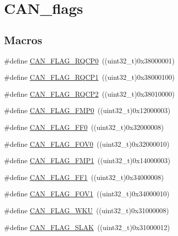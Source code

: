 \hypertarget{group___c_a_n__flags}{\section{C\-A\-N\-\_\-flags}
\label{group___c_a_n__flags}
}
\subsection*{Macros}
\begin{DoxyCompactItemize}
\item 
\#define \hyperlink{group___c_a_n__flags_ga6df0579049eb471720ea103c5446298b}{C\-A\-N\-\_\-\-F\-L\-A\-G\-\_\-\-R\-Q\-C\-P0}~((uint32\-\_\-t)0x38000001)
\item 
\#define \hyperlink{group___c_a_n__flags_gaba705586ebc3d961507436c03a2feaba}{C\-A\-N\-\_\-\-F\-L\-A\-G\-\_\-\-R\-Q\-C\-P1}~((uint32\-\_\-t)0x38000100)
\item 
\#define \hyperlink{group___c_a_n__flags_ga9c20cd47e558135bd7ae71149583d487}{C\-A\-N\-\_\-\-F\-L\-A\-G\-\_\-\-R\-Q\-C\-P2}~((uint32\-\_\-t)0x38010000)
\item 
\#define \hyperlink{group___c_a_n__flags_ga4b40574700edfe752433bb4e0d457c64}{C\-A\-N\-\_\-\-F\-L\-A\-G\-\_\-\-F\-M\-P0}~((uint32\-\_\-t)0x12000003)
\item 
\#define \hyperlink{group___c_a_n__flags_ga11648741ff43af1561ce7009698fb797}{C\-A\-N\-\_\-\-F\-L\-A\-G\-\_\-\-F\-F0}~((uint32\-\_\-t)0x32000008)
\item 
\#define \hyperlink{group___c_a_n__flags_ga2abd66b5e0032132673208decd2d01f2}{C\-A\-N\-\_\-\-F\-L\-A\-G\-\_\-\-F\-O\-V0}~((uint32\-\_\-t)0x32000010)
\item 
\#define \hyperlink{group___c_a_n__flags_ga5d4b7376954a059fbd74ed8d688f6657}{C\-A\-N\-\_\-\-F\-L\-A\-G\-\_\-\-F\-M\-P1}~((uint32\-\_\-t)0x14000003)
\item 
\#define \hyperlink{group___c_a_n__flags_ga0fa967743c5db04189bb2160aa48e371}{C\-A\-N\-\_\-\-F\-L\-A\-G\-\_\-\-F\-F1}~((uint32\-\_\-t)0x34000008)
\item 
\#define \hyperlink{group___c_a_n__flags_gac1af6e61b1285ddc4658c4bcc152719a}{C\-A\-N\-\_\-\-F\-L\-A\-G\-\_\-\-F\-O\-V1}~((uint32\-\_\-t)0x34000010)
\item 
\#define \hyperlink{group___c_a_n__flags_ga18c72dbe75cb80e8b5126c23c9120818}{C\-A\-N\-\_\-\-F\-L\-A\-G\-\_\-\-W\-K\-U}~((uint32\-\_\-t)0x31000008)
\item 
\#define \hyperlink{group___c_a_n__flags_gad087b5025a3d5ead2c32b06663821cf4}{C\-A\-N\-\_\-\-F\-L\-A\-G\-\_\-\-S\-L\-A\-K}~((uint32\-\_\-t)0x31000012)

\end{DoxyCompactItemize}
